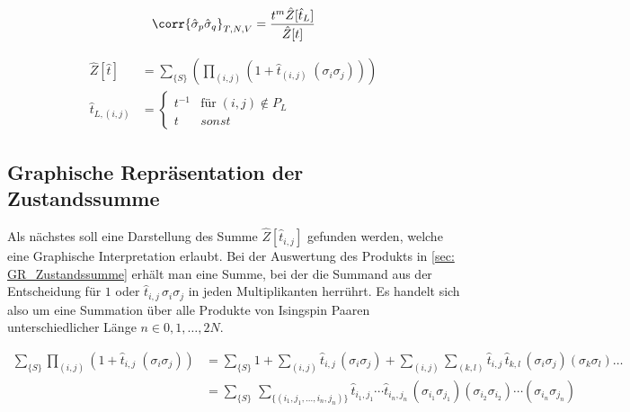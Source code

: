 \begin{grayframe}[frametitle = {Spin Korrelation als Zustandsumme auf defektem Gitter}]
\begin{equation}
\corr{\hat{\sigma}_{p} \hat{\sigma}_{q} }_{T,N,V} = \frac{t^m \hat{Z}[\hat{t}_L]}{\hat{Z}[t]}
\end{equation}

\begin{align}
\hat{Z}[\hat{t}] &=\sum_{\{S\}} \left(\prod_{(i,j)} (1 + \hat{t}_{(i,j)} \; (\sigma_i \sigma_j)) \right) \label{eq: zustandsfunktional}\\
\hat{t}_{L,(i,j)} &= \left\{\begin{array}{ll} t^{-1} & \text{für}\; (i,j)\notin P_L \\
          t & sonst \end{array} \right.
\end{align}

\end{grayframe}

\subsection{Graphische Repräsentation der Zustandssumme} \label{sec: GR_Zustandssumme}

Als nächstes soll eine Darstellung des Summe $\hat{Z}[\hat{t}_{i,j}]$ gefunden werden, welche eine Graphische Interpretation erlaubt. Bei der Auswertung des Produkts in \eqref{sec: GR_Zustandssumme} erhält man eine Summe, bei der die Summand aus der Entscheidung für $1$ oder $\hat{t}_{i,j}\,\sigma_i \sigma_j$ in jeden Multiplikanten herrührt. Es handelt sich also um eine Summation über alle Produkte von Isingspin Paaren unterschiedlicher Länge $n \in {0,1,\dots ,2N}$. 

\begin{align}
\sum_{\{S\}} \prod_{(i,j)} (1 +  \hat{t}_{i,j} \; (\sigma_i \sigma_j)) 
&= 
\sum_{\{S\}} 1 + \sum_{(i,j)} \hat{t}_{i,j}\,(\sigma_i \sigma_j) + \sum_{(i,j)}\sum_{(k,l)} \hat{t}_{i,j}\, \hat{t}_{k,l}\,(\sigma_i \sigma_j)  (\sigma_k \sigma_l) \dots \\
&= \sum_{\{S\}} \, \sum_{\{(i_1,j_1,...,i_n,j_n)\}} \hat{t}_{i_1,j_1} \cdots \hat{t}_{i_n,j_n} \, (\sigma_{i_1} \sigma_{j_1})(\sigma_{i_2} \sigma_{i_2}) \cdots (\sigma_{i_n} \sigma_{j_n})
\end{align}

